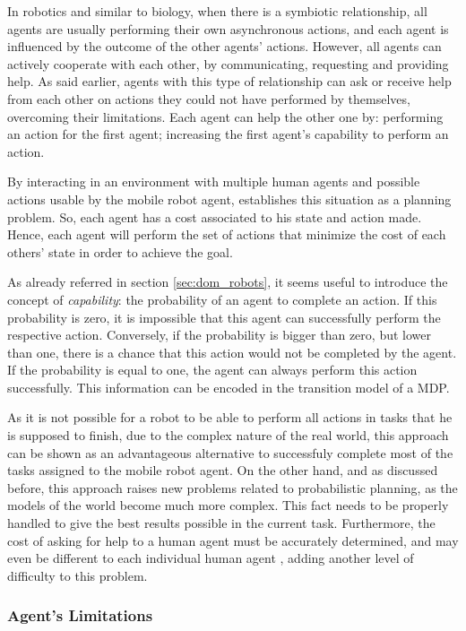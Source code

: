 In robotics and similar to biology, when there is a symbiotic
relationship, all agents are usually performing their own asynchronous actions,
and each agent is influenced by the outcome of the other agents' actions.
However, all agents can actively cooperate with each other, by communicating,
requesting and providing help.
As said earlier, agents with this type of relationship can ask or receive help
from each other on actions they could not have performed by themselves,
overcoming their limitations. Each agent can help the other one by: performing
an action for the first agent; increasing the first agent's capability to
perform an action.

By interacting in an environment with multiple human agents and possible
actions usable by the mobile robot agent,
establishes this situation as a planning problem. So, each agent has a cost
associated to his state and action made. Hence, each agent will perform the set
of actions that minimize the cost of each others' state in order to achieve the goal.

As already referred in section \ref{sec:dom_robots}, it seems useful to introduce
the concept of \textit{capability}: the probability of an agent to complete an
action. If this probability is zero, it
is impossible that this agent can successfully perform the respective action.
Conversely, if the probability is bigger than zero, but lower than one, there is
a chance that this action would not be completed by the agent. If the
probability is equal to one, the agent can always perform this action
successfully. This information can be encoded in the transition model of a
\gls{MDP}.

As it is not possible for a robot to be able to perform all actions in tasks
that he is supposed to finish, due to the complex nature of the real world, this
approach can be shown as an advantageous alternative to successfuly complete
most of the tasks assigned to the mobile robot agent. On the other hand, and as
discussed before, this approach raises new problems related to probabilistic
planning, as the models of the world become much more complex. This fact needs
to be properly handled to give the best results possible in the current task.
Furthermore, the cost of asking for help to a human agent must be accurately
determined, and may even be different to each individual human agent
\cite{rosenthal2012monte}, adding another level of difficulty to this problem.

\subsubsection{Agent's Limitations}

